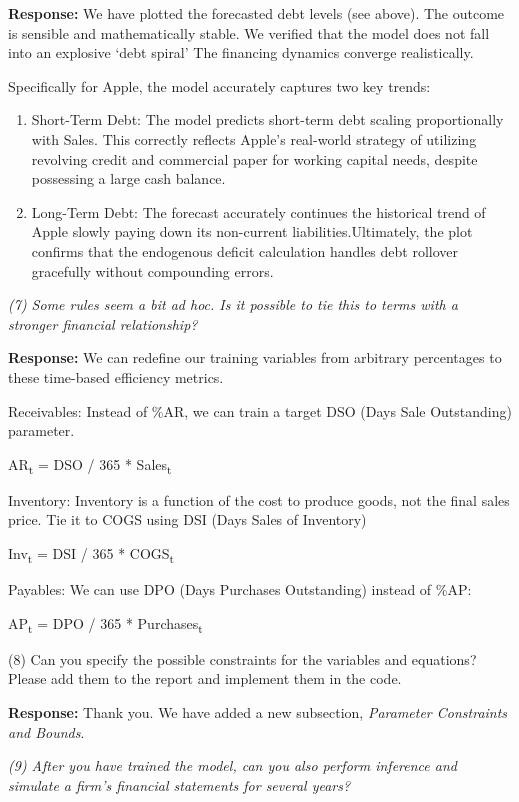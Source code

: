 \documentclass[12pt,a4paper]{article}
\begin{document}
\textbf{Response:} We have plotted the forecasted debt levels (see above).
The outcome is sensible and mathematically stable. We verified that the
model does not fall into an explosive `debt
spiral' The financing dynamics converge realistically.

Specifically for Apple, the model accurately captures two key trends:

\begin{enumerate}
\def\labelenumi{\arabic{enumi}.}
\item
  Short-Term Debt: The model predicts short-term debt scaling
  proportionally with Sales. This correctly reflects
  Apple's real-world strategy of utilizing revolving
  credit and commercial paper for working capital needs, despite
  possessing a large cash balance.
\item
  Long-Term Debt: The forecast accurately continues the historical trend
  of Apple slowly paying down its non-current liabilities.Ultimately,
  the plot confirms that the endogenous deficit calculation handles debt
  rollover gracefully without compounding errors.
\end{enumerate}

\emph{(7) Some rules seem a bit ad hoc. Is it possible to tie this to
terms with a stronger financial relationship?}

\textbf{Response:} We can redefine our training variables from arbitrary
percentages to these time-based efficiency metrics.

Receivables: Instead of \%AR, we can train a target DSO (Days Sale
Outstanding) parameter.

AR\textsubscript{t} = DSO / 365 * Sales\textsubscript{t}

Inventory: Inventory is a function of the cost to produce goods, not the
final sales price. Tie it to COGS using DSI (Days Sales of Inventory)

Inv\textsubscript{t} = DSI / 365 * COGS\textsubscript{t}

Payables: We can use DPO (Days Purchases Outstanding) instead of \%AP:

AP\textsubscript{t} = DPO / 365 * Purchases\textsubscript{t}

(8) Can you specify the possible constraints for the variables and
equations? Please add them to the report and implement them in the code.

\textbf{Response:} Thank you. We have added a new subsection,
\emph{Parameter Constraints and Bounds}.

\emph{(9) After you have trained the model, can you also perform
inference and simulate a firm's financial statements for several years?}
\end{document}
